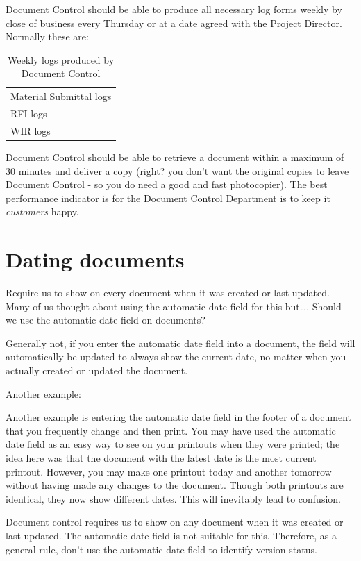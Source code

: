 Document Control should be able to produce all necessary log forms weekly by close of business every Thursday or at a date agreed with the Project Director. Normally these are:

\begin{table}
\begin{tabular}{l}
\toprule
Material Submittal logs\\
RFI logs\\
WIR logs\\
\bottomrule
\end{tabular}
\caption{Weekly logs produced by Document Control}
\end{table}


Document Control should be able to retrieve a document within a maximum of 30 minutes and deliver a copy (right? you don't want the original copies to leave Document Control - so you do need a good and fast photocopier). The best performance indicator is for the Document Control Department is to keep it \textit{customers} happy. 

\section*{Dating documents}

Require us to show on every document when it was created or last updated. Many of us thought about using the automatic date field for this but….
Should we use the automatic date field on documents?

Generally not, if you enter the automatic date field into a document, the field will automatically be updated to always show the current date, no matter when you actually created or updated the document.



Another example:

Another example is entering the automatic date field in the footer of a document that you frequently change and then print. You may have used the automatic date field as an easy way to see on your printouts when they were printed; the idea here was that the document with the latest date is the most current printout. However, you may make one printout today and another tomorrow without having made any changes to the document. Though both printouts are identical, they now show different dates. This will inevitably lead to confusion. 

Document control requires us to show on any document when it was created or last updated. The automatic date field is not suitable for this. Therefore, as a general rule, don’t use the automatic date field to identify version status.


